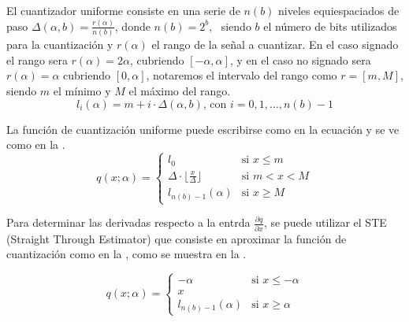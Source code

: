 El cuantizador uniforme consiste en una serie de $n\left(b\right)$ niveles equiespaciados de paso $\Delta\left(\alpha, b\right) = \frac{r\left(\alpha\right)}{n\left(b\right)}$, donde $n\left(b\right) = 2^b$, \
siendo $b$ el número de bits utilizados para la cuantización y $r\left(\alpha\right)$ el rango de la señal a cuantizar. En el caso signado el rango sera $r(\alpha) = 2 \alpha$, cubriendo $[-\alpha, \alpha]$, y en el caso no signado sera $r(\alpha) = \alpha$ cubriendo $[0, \alpha]$, notaremos el intervalo del rango como $r = [m, M]$, siendo $m$ el mínimo y $M$ el máximo del rango.
\begin{equation}
    \label{eq:uniform_quantizer_level_value}
    l_i\left(\alpha\right) = m + i \cdot \Delta\left(\alpha, b\right) \text{, con } i = 0, 1, \ldots, n\left(b\right) - 1
\end{equation}

La función de cuantización uniforme puede escribirse como en la ecuación  y se ve como en la .
\begin{equation}
    \label{eq:uniform_quantizer_signed}
    q(x; \alpha) =
    \begin{cases}
        l_{0} & \text{si $x \leq m$} \\
        \Delta \cdot \lfloor \frac{x}{\Delta} \rfloor & \text{si } m < x < M \\
        l_{n\left(b\right) - 1}\left(\alpha\right) & \text{si } x \geq M
    \end{cases}
\end{equation}


Para determinar las derivadas respecto a la entrda $\frac{\partial q}{\partial x}$, se puede utilizar el STE (Straight Through Estimator) que consiste en aproximar la función de cuantización como en la , como se muestra en la .

\begin{equation}
    \label{eq:uniform_quantizer_ste_signed}
    q\left(x; \alpha\right) =
    \begin{cases}
        - \alpha & \text{si $x \leq -\alpha$} \\
        x \\
        l_{n\left(b\right) - 1}\left(\alpha\right) & \text{si $x \geq \alpha$}
    \end{cases}
\end{equation}

